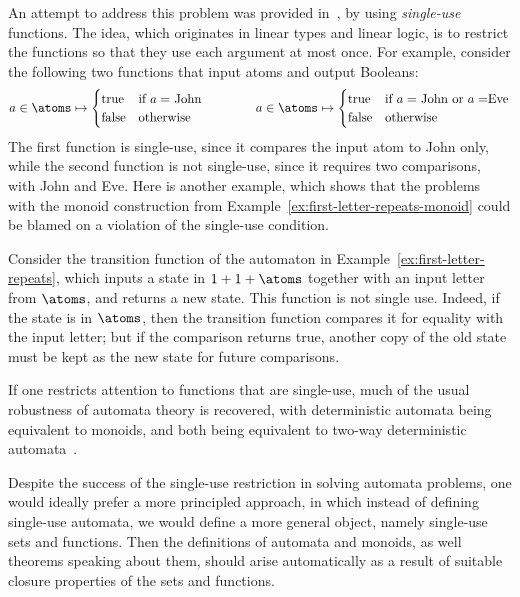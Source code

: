An attempt to address this problem was provided in~\cite{stefansk-msc,stefanski-phd,bojanczykstefanski2020}, by using \emph{single-use} functions. The idea, which originates in linear types and linear logic,  is to restrict the functions so that they use each argument at most once. For example, consider the following two functions that input atoms and output Booleans:
\begin{align*}
a \in \atoms \mapsto 
\begin{cases}
    \text{true} & \text{if $a=$ John}\\
    \text{false} & \text{otherwise}
\end{cases}
\qquad \qquad 
a \in \atoms \mapsto 
\begin{cases}
    \text{true} & \text{if $a=$ John or $a = $Eve}\\
    \text{false} & \text{otherwise}
\end{cases}
\end{align*}
The first function is single-use, since it compares the input atom to John only, while the second function is not single-use, since it requires two comparisons, with John and Eve. Here is another example, which shows that the problems with the monoid construction from Example~\ref{ex:first-letter-repeats-monoid} could be blamed on a violation of the single-use condition.
\begin{example}
    Consider  the transition function of the automaton in Example~\ref{ex:first-letter-repeats}, which inputs a state in $1 + 1 + \atoms$ together with an input letter from $\atoms$, and returns a new state.  This function is not single use. Indeed, if the state is in $\atoms$, then the transition function compares it for equality with the input letter; but if the comparison returns true, another copy of the old state must be kept as the new state for future comparisons. \exampleend
\end{example}

If one restricts attention to functions that are single-use, much of the usual robustness of automata theory is recovered, with deterministic automata being equivalent to monoids, and both being equivalent to two-way deterministic automata~\cite{bojanczykstefanski2020}.

Despite the success of the single-use restriction in solving automata problems, one would ideally prefer a more principled approach, in which instead of defining single-use automata, we would define a more general object, namely single-use sets and functions. Then the definitions of  automata and monoids, as well theorems speaking about them, should arise automatically as a result of suitable closure properties of the sets and functions.

